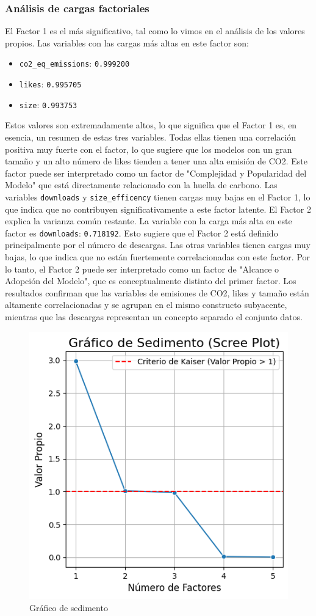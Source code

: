 \documentclass[journal]{IEEEtran}
\begin{document}
	\subsubsection{Análisis de cargas factoriales}
	El Factor 1 es el más significativo, tal como lo vimos en el análisis de los valores propios. Las variables con las cargas más altas en este factor son:
	\begin{itemize}
		\item \texttt{co2\_eq\_emissions}: \texttt{0.999200}
		\item \texttt{likes}: \texttt{0.995705}
		\item \texttt{size}: \texttt{0.993753}
	\end{itemize}
	Estos valores son extremadamente altos, lo que significa que el Factor 1 es, en esencia, un resumen de estas tres variables. Todas ellas tienen una correlación positiva muy fuerte con el factor, lo que sugiere que los modelos con un gran tamaño y un alto número de likes tienden a tener una alta emisión de CO2. Este factor puede ser interpretado como un factor de "Complejidad y Popularidad del Modelo" que está directamente relacionado con la huella de carbono.
	Las variables \texttt{downloads} y \texttt{size\_efficency} tienen cargas muy bajas en el Factor 1, lo que indica que no contribuyen significativamente a este factor latente.
	El Factor 2 explica la varianza común restante. La variable con la carga más alta en este factor es \texttt{downloads}: \texttt{0.718192}. Esto sugiere que el Factor 2 está definido principalmente por el número de descargas. Las otras variables tienen cargas muy bajas, lo que indica que no están fuertemente correlacionadas con este factor. Por lo tanto, el Factor 2 puede ser interpretado como un factor de "Alcance o Adopción del Modelo", que es conceptualmente distinto del primer factor.
	Los resultados confirman que las variables de emisiones de CO2, likes y tamaño están altamente correlacionadas y se agrupan en el mismo constructo subyacente, mientras que las descargas representan un concepto separado el conjunto datos.
	\begin{figure}[H]
		\centering
		\includegraphics[width=0.8\columnwidth]{assets/kaiser.png}
		\caption{Gráfico de sedimento}
		\label{fig:pca_scatter}
	\end{figure}
\end{document}
